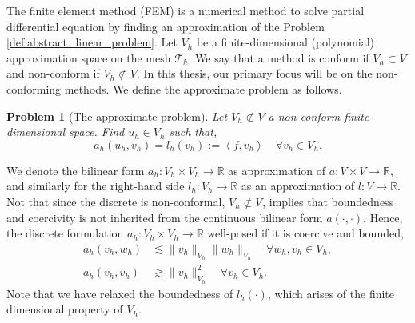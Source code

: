 \documentclass[11pt]{article}
\newtheorem{problem}[theorem]{Problem}
\theoremstyle{remark}
\numberwithin{equation}{section}
\begin{document}
The finite element method (FEM) is a numerical method to solve partial differential equation by finding an approximation of the Problem \ref{def:abstract_linear_problem}.  Let $V_{h}$ be a finite-dimensional (polynomial) approximation space on the mesh
$\mathcal{T} _{h}$. We say that a method is conform if $V_{h}\subset V $ and non-conform if $V _{h} \not\subset V$. In this thesis, our primary focus will be on the non-conforming methods. We define the approximate problem as follows.
\begin{problem}[The approximate problem]
    \label{def:approx_problem}
    Let $V_{h} \not\subset V$ a non-conform finite-dimensional space. Find  $u_{h} \in V_{h}$ such that, \[
    a_{h}(u_{h},v_{h} ) = l_{h}( v_{h}) :=  \left<f,v_{h} \right> \quad   \forall v_{h} \in V_{h}.
    \]
\end{problem}

We denote the bilinear form $a_{h}: V_{h} \times V_{h} \to \mathbb{R} $ as approximation of $a: V \times V \to \mathbb{R} $, and similarly for the right-hand side $l_{h} : V _{h} \to \mathbb{R} $ as an approximation of $l: V \to \mathbb{R} $.
Not that since the discrete is non-conformal, $V_{h} \not \subset  V_{}$, implies that boundedness and coercivity is not inherited from the continuous bilinear form $a( \cdot ,\cdot ) $. Hence, the discrete formulation $a_{h}:V_{h} \times V_{h}
\to \mathbb{R}  $ well-posed if it is coercive and bounded, \begin{equation}
    \begin{split}
   a_{h}( v_{h}, w_{h}) & \lesssim \| v_{h} \|_{ V_{h} }^{  } \| w_{h} \|_{ V_{h} }^{  } \quad    \forall w_{h},v_{h} \in V_{h},\\
   a_{h}( v_{h}, v_{h}) & \gtrsim  \| v_{h} \|_{ V_{h} }^{  2} \quad  \forall v_{h} \in V_{h}.
    \end{split}
\end{equation}
Note that we have relaxed the boundedness of $l_{h}( \cdot ) $, which arises of the finite dimensional property of $V_{h}$.
\end{document}
